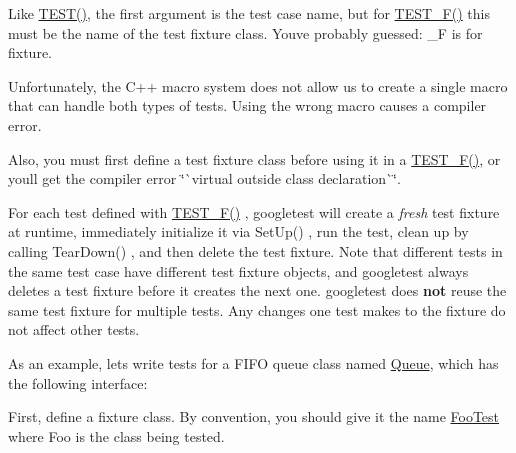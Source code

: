 Like {\ttfamily \mbox{\hyperlink{googletest-master_2googletest_2include_2gtest_2gtest_8h_ab5540a6d621853916be8240ff51819cf}{T\+E\+S\+T()}}}, the first argument is the test case name, but for {\ttfamily \mbox{\hyperlink{googletest-master_2googletest_2include_2gtest_2gtest_8h_a0ee66d464d1a06c20c1929cae09d8758}{T\+E\+S\+T\+\_\+\+F()}}} this must be the name of the test fixture class. You\textquotesingle{}ve probably guessed\+: {\ttfamily \+\_\+F} is for fixture.

Unfortunately, the C++ macro system does not allow us to create a single macro that can handle both types of tests. Using the wrong macro causes a compiler error.

Also, you must first define a test fixture class before using it in a {\ttfamily \mbox{\hyperlink{googletest-master_2googletest_2include_2gtest_2gtest_8h_a0ee66d464d1a06c20c1929cae09d8758}{T\+E\+S\+T\+\_\+\+F()}}}, or you\textquotesingle{}ll get the compiler error \char`\"{}\`{}virtual outside class
declaration\`{}\char`\"{}.

For each test defined with {\ttfamily \mbox{\hyperlink{googletest-master_2googletest_2include_2gtest_2gtest_8h_a0ee66d464d1a06c20c1929cae09d8758}{T\+E\+S\+T\+\_\+\+F()}}} , googletest will create a {\itshape fresh} test fixture at runtime, immediately initialize it via {\ttfamily Set\+Up()} , run the test, clean up by calling {\ttfamily Tear\+Down()} , and then delete the test fixture. Note that different tests in the same test case have different test fixture objects, and googletest always deletes a test fixture before it creates the next one. googletest does {\bfseries{not}} reuse the same test fixture for multiple tests. Any changes one test makes to the fixture do not affect other tests.

As an example, let\textquotesingle{}s write tests for a F\+I\+FO queue class named {\ttfamily \mbox{\hyperlink{class_queue}{Queue}}}, which has the following interface\+:


\begin{DoxyCode}{0}
\DoxyCodeLine{\};}
\end{DoxyCode}


First, define a fixture class. By convention, you should give it the name {\ttfamily \mbox{\hyperlink{class_foo_test}{Foo\+Test}}} where {\ttfamily Foo} is the class being tested.


